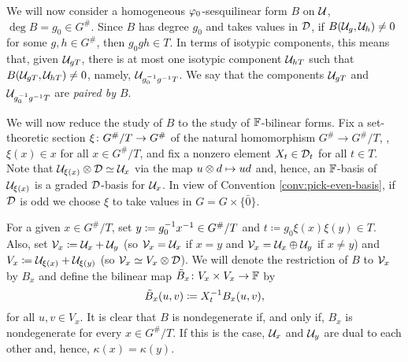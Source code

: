 We will now consider a 
homogeneous $\varphi_0$-sesquilinear form $B$ on $\mathcal U$, $\deg B = g_0 \in G^\#$.
Since $B$ has degree $g_0$ and takes values in $\mathcal{D}$, if $B(\mathcal U_{g}, \mathcal U_{h}) \neq 0$ for some $g, h \in G^\#$, then $g_0 g h \in T$. 
In terms of isotypic components, this means that, given $\mathcal U_{g T}$, there is at most one isotypic component $\mathcal U_{hT}$ such that $B(\mathcal U_{gT}, \mathcal U_{hT}) \neq 0$, namely, $\mathcal U_{g_0^{-1} g^{-1} T}$. 
We say that the components $\mathcal U_{gT}$ and $\mathcal U_{g_0^{-1} g^{-1} T}$ are \emph{paired by $B$}.



We will now reduce the study of $B$ to the study of $\mathbb{F}$-bilinear forms. 
Fix a set-theoretic section $\xi\colon G^\#/T \to G^\#$ of the natural homomorphism $ G^\# \to G^\#/T$, \ie, $\xi (x) \in x$ for all $x \in G^\#/T$, and fix a nonzero element $X_t \in \mathcal{D}_t$ for all $t\in T$. 
Note that $\mathcal U_{\xi(x)} \otimes \mathcal{D} \simeq \mathcal U_x$ via the map $u \otimes d \mapsto ud$ and, hence, an $\mathbb{F}$-basis of $\mathcal U_{\xi(x)}$ is a graded $\mathcal{D}$-basis for $\mathcal U_x$. 
In view of Convention \ref{conv:pick-even-basis}, if $\mathcal{D}$ is odd we choose $\xi$ to take values in $G = G\times \{ \bar 0 \}$.

For a given $x \in G^\#/T$, set $y \coloneqq g_0^{-1} x^{-1} \in G^\#/T$ and $t \coloneqq g_0 \xi(x) \xi(y) \in T$. 
Also, set $\mathcal V_x \coloneqq \mathcal U_x + \mathcal U_y$ (so $\mathcal V_x = \mathcal U_x$ if $x=y$ and $\mathcal V_x = \mathcal U_x \oplus \mathcal U_y$ if $x \neq y$) and $V_x \coloneqq \mathcal U_{\xi(x)} + \mathcal U_{\xi(y)}$ (so $\mathcal V_x \simeq V_x \otimes \mathcal{D}$). 
We will denote the restriction of $B$ to $\mathcal V_x$ by $B_x$ and define the bilinear map $\tilde{B}_x\colon V_x \times V_x \to \mathbb{F}$ by 
\begin{equation}\label{eq:B_x-tilde}
    \tilde{B}_x (u,v) \coloneqq X_{t}^{-1} B_x (u,v),
\end{equation}
for all $u,v \in V_x$. 
It is clear that $B$ is nondegenerate if, and only if, $B_x$ is nondegenerate for every $x \in G^\#/T$. 
If this is the case, $\mathcal U_x$ and $\mathcal U_y$ are dual to each other and, hence, $\kappa(x) = \kappa(y)$. 

